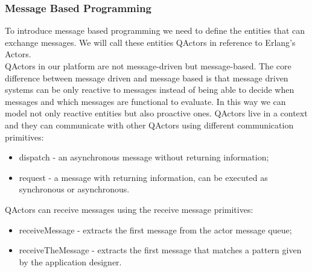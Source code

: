 \documentclass{llncs}
\begin{document}
\subsubsection{Message Based Programming}
	To introduce message based programming we need to define the entities that can exchange messages. We will call these entities QActors in reference to Erlang's Actors.\\ 
	QActors in our platform are not message-driven but message-based. The core difference between message driven and message based is that message driven systems can be only reactive to messages instead of being able to decide when messages and which messages are functional to evaluate. In this way we can model not only reactive entities but also proactive ones. QActors live in a context and they can communicate with other QActors using different communication primitives:
\begin{itemize}
		\item dispatch - an asynchronous message without returning information;
		\item request - a message with returning information, can be executed as synchronous or asynchronous.
\end{itemize}
QActors can receive messages using the receive message primitives:
\begin{itemize}
		\item receiveMessage - extracts the first message from the actor message queue;
		\item receiveTheMessage - extracts the first message that matches a pattern given by the application designer.
\end{itemize}
\end{document}
